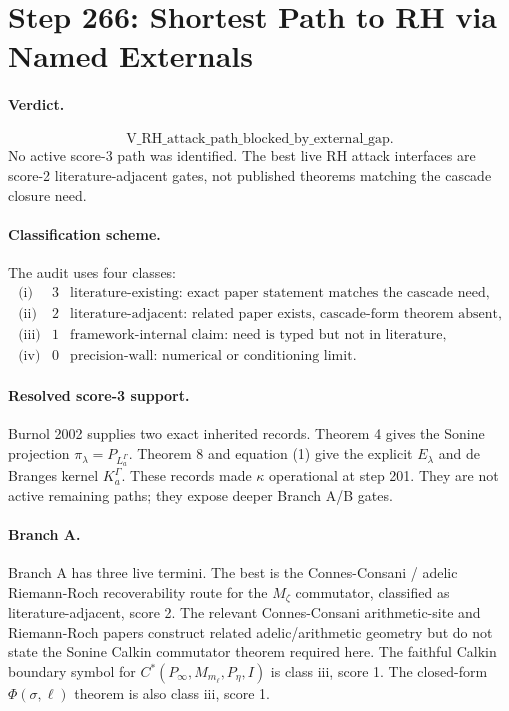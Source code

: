 \section*{Step 266: Shortest Path to RH via Named Externals}

\paragraph{Verdict.}
\[
\mathrm{V\_RH\_attack\_path\_blocked\_by\_external\_gap}.
\]
No active score-3 path was identified.  The best live RH attack interfaces are
score-2 literature-adjacent gates, not published theorems matching the cascade
closure need.

\paragraph{Classification scheme.}
The audit uses four classes:
\[
\begin{array}{ccl}
\text{(i)} & 3 & \text{literature-existing: exact paper statement matches the cascade need},\\
\text{(ii)} & 2 & \text{literature-adjacent: related paper exists, cascade-form theorem absent},\\
\text{(iii)} & 1 & \text{framework-internal claim: need is typed but not in literature},\\
\text{(iv)} & 0 & \text{precision-wall: numerical or conditioning limit}.
\end{array}
\]

\paragraph{Resolved score-3 support.}
Burnol 2002 supplies two exact inherited records.  Theorem 4 gives the Sonine
projection \(\pi_\lambda=P_{L_a^\Gamma}\).  Theorem 8 and equation (1) give
the explicit \(E_\lambda\) and de Branges kernel \(K_a^\Gamma\).  These records
made \(\kappa\) operational at step 201.  They are not active remaining paths;
they expose deeper Branch A/B gates.

\paragraph{Branch A.}
Branch A has three live termini.  The best is the Connes-Consani / adelic
Riemann-Roch recoverability route for the \(M_\zeta\) commutator, classified
as literature-adjacent, score 2.  The relevant Connes-Consani arithmetic-site
and Riemann-Roch papers construct related adelic/arithmetic geometry but do not
state the Sonine Calkin commutator theorem required here.  The faithful Calkin
boundary symbol for \(C^*(P_\infty,M_{m_\ell},P_\eta,I)\) is class iii, score 1.
The closed-form \(\Phi(\sigma,\ell)\) theorem is also class iii, score 1.

